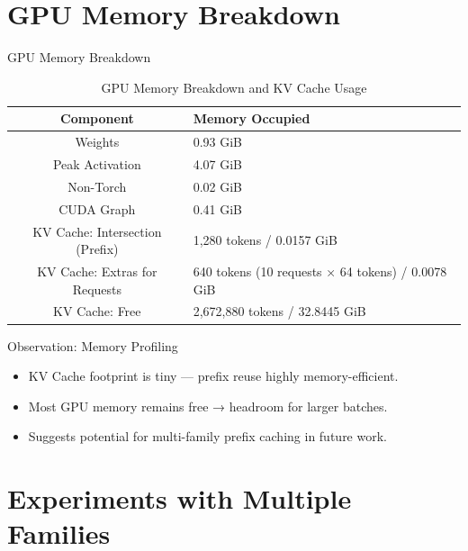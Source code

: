 \documentclass[Serif, 10pt, brown]{beamer}
\theoremstyle{example}
\theoremstyle{plain}
\begin{document}
\section{GPU Memory Breakdown}

\begin{frame}{GPU Memory Breakdown}
    \begin{table}[h!]
\centering
\begin{tabular}{|c|p{4cm}|}
\hline
\textbf{Component} & \textbf{Memory Occupied} \\
\hline
Weights  & 0.93 GiB \\
\hline
Peak Activation  & 4.07 GiB \\
\hline
Non-Torch  & 0.02 GiB \\
\hline
CUDA Graph & 0.41 GiB \\
\hline
KV Cache: Intersection (Prefix)  & 1,280 tokens / 0.0157 GiB \\
\hline
KV Cache: Extras for Requests  & 640 tokens (10 requests × 64 tokens) / 0.0078 GiB \\
\hline
KV Cache: Free & 2,672,880 tokens / 32.8445 GiB \\
\hline
\end{tabular}
\caption{GPU Memory Breakdown and KV Cache Usage}
\label{tab:gpu_memory_breakdown}
\end{table}
\end{frame}

\begin{frame}{Observation: Memory Profiling}
\begin{itemize}
    \item KV Cache footprint is tiny — prefix reuse highly memory-efficient.
    \item Most GPU memory remains free → headroom for larger batches.
    \item Suggests potential for multi-family prefix caching in future work.
\end{itemize}
\end{frame}

\section{Experiments with Multiple Families}
\end{document}

